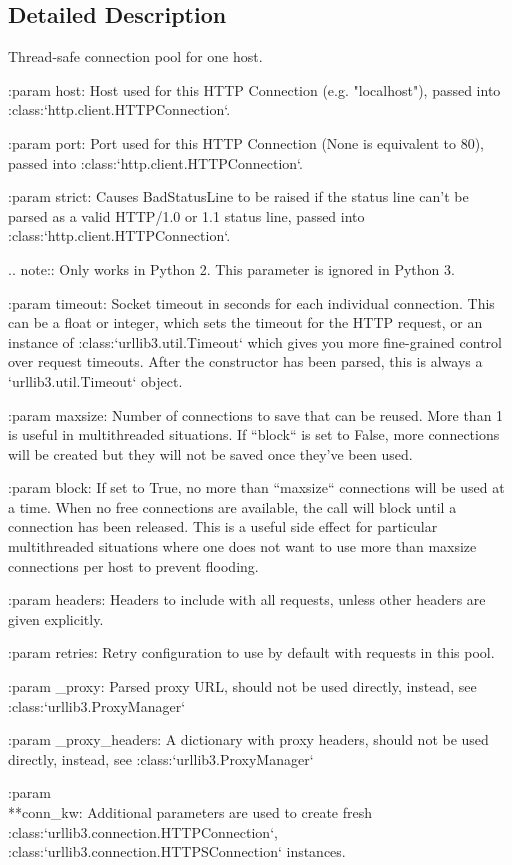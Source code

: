 \subsection{Detailed Description}
\begin{DoxyVerb}Thread-safe connection pool for one host.

:param host:
    Host used for this HTTP Connection (e.g. "localhost"), passed into
    :class:`http.client.HTTPConnection`.

:param port:
    Port used for this HTTP Connection (None is equivalent to 80), passed
    into :class:`http.client.HTTPConnection`.

:param strict:
    Causes BadStatusLine to be raised if the status line can't be parsed
    as a valid HTTP/1.0 or 1.1 status line, passed into
    :class:`http.client.HTTPConnection`.

    .. note::
       Only works in Python 2. This parameter is ignored in Python 3.

:param timeout:
    Socket timeout in seconds for each individual connection. This can
    be a float or integer, which sets the timeout for the HTTP request,
    or an instance of :class:`urllib3.util.Timeout` which gives you more
    fine-grained control over request timeouts. After the constructor has
    been parsed, this is always a `urllib3.util.Timeout` object.

:param maxsize:
    Number of connections to save that can be reused. More than 1 is useful
    in multithreaded situations. If ``block`` is set to False, more
    connections will be created but they will not be saved once they've
    been used.

:param block:
    If set to True, no more than ``maxsize`` connections will be used at
    a time. When no free connections are available, the call will block
    until a connection has been released. This is a useful side effect for
    particular multithreaded situations where one does not want to use more
    than maxsize connections per host to prevent flooding.

:param headers:
    Headers to include with all requests, unless other headers are given
    explicitly.

:param retries:
    Retry configuration to use by default with requests in this pool.

:param _proxy:
    Parsed proxy URL, should not be used directly, instead, see
    :class:`urllib3.ProxyManager`

:param _proxy_headers:
    A dictionary with proxy headers, should not be used directly,
    instead, see :class:`urllib3.ProxyManager`

:param \\**conn_kw:
    Additional parameters are used to create fresh :class:`urllib3.connection.HTTPConnection`,
    :class:`urllib3.connection.HTTPSConnection` instances.
\end{DoxyVerb}
 

